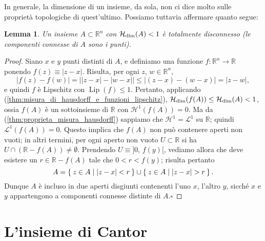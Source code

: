 \documentclass[a4paper,10pt,openright,oneside]{book}
\theoremstyle{theoremstyle}
\newtheorem{lemma}[teorema]{Lemma}
\theoremstyle{theoremstylewoheader}
\theoremstyle{theoremstyle}
\theoremstyle{proofsecstyle}
\theoremstyle{nonumberplain}
\newtheorem{proof}{Dim.}
\newcommand{\RR}{\ensuremath{\mathbb{R}}}
\newcommand{\Leb}{\ensuremath{\mathcal{L}}}
\newcommand{\Haus}{\ensuremath{\mathcal{H}}}
\newcommand{\Hausdim}{\ensuremath{\Haus_\textup{dim}}}
\newcommand{\abs}[1]{\ensuremath{\lvert #1 \rvert}}
\newcommand{\Abs}[1]{\ensuremath{\Big\lvert #1 \Big\rvert}}
\DeclareMathOperator{\Lip}{Lip}
\renewcommand{\qedsymbol}{\ensuremath{\square}}
\newcommand{\qed}{\unskip\nobreak\hfill\nobreak\hspace{.5em}\qedsymbol}
\begin{document}
\noindent In generale, la dimensione di un insieme, da sola, non ci dice molto sulle proprietà topologiche di quest'ultimo. Possiamo tuttavia affermare quanto segue:

\begin{lemma}
Un insieme $A \subset \RR^n$ con $\Hausdim(A) < 1$ è totalmente disconnesso (le componenti connesse di $A$ sono i punti).
\end{lemma}

\begin{proof}
Siano $x$ e $y$ punti distinti di $A$, e definiamo una funzione $f : \RR^n \rightarrow \RR$ ponendo $f(z) \equiv \abs{z - x}$. Risulta, per ogni $z,\, w \in \RR^n$,
\[
\abs{f(z) - f(w)} = \Abs{\abs{z - x} - \abs{w - x}} \le \Abs{(z - x) - (w - x)} = \abs{z - w},
\]
e quindi $f$ è Lipschitz con $\Lip(f) \le 1$. Pertanto, applicando (\ref{thm:misura_di_hausdorff_e_funzioni_lipschitz}), $\Hausdim(f(A)) \le \Hausdim(A) < 1$, ossia $f(A)$ è un sottoinsieme di $\RR$ con $\Haus^1(f(A)) = 0$. Ma da (\ref{thm:proprieta_misura_hausdorff}) sappiamo che $\Haus^1 = \Leb^1$ su $\RR$; quindi $\Leb^1(f(A)) = 0$. Questo implica che $f(A)$ non può contenere aperti non vuoti; in altri termini, per ogni aperto non vuoto $U \subset \RR$ si ha $U \cap (\RR - f(A)) \ne \emptyset$. Prendendo $U \equiv ]0,\, f(y)[$, vediamo allora che deve esistere un $r \in \RR - f(A)$ tale che $0 < r < f(y)$; risulta pertanto
\[
A = \Set{ z \in A | \abs{z - x} < r } \cup \Set{ z \in A | \abs{z - x} > r }.
\] 
Dunque $A$ è incluso in due aperti disgiunti contenenti l'uno $x$, l'altro $y$, sicché $x$ e $y$ appartengono a componenti connesse distinte di $A$.\qed
\end{proof}

\section{L'insieme di Cantor}
\end{document}
